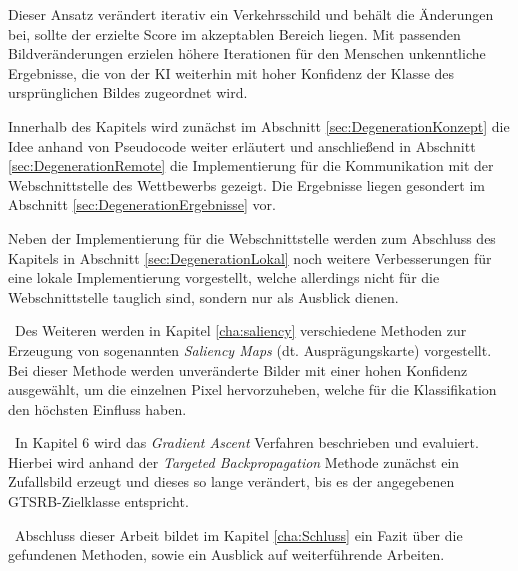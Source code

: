 Dieser Ansatz verändert iterativ ein Verkehrsschild und behält die Änderungen bei, sollte der erzielte Score im akzeptablen Bereich liegen. Mit passenden Bildveränderungen erzielen höhere Iterationen für den Menschen unkenntliche Ergebnisse, die von der \ac{KI} weiterhin mit hoher Konfidenz der Klasse des ursprünglichen Bildes zugeordnet wird. 

Innerhalb des Kapitels wird zunächst im Abschnitt \ref{sec:DegenerationKonzept} die Idee anhand von Pseudocode weiter erläutert und anschließend in Abschnitt \ref{sec:DegenerationRemote} die Implementierung für die Kommunikation mit der Webschnittstelle des Wettbewerbs gezeigt. Die Ergebnisse liegen gesondert im Abschnitt \ref{sec:DegenerationErgebnisse} vor. 

Neben der Implementierung für die Webschnittstelle werden zum Abschluss des Kapitels in Abschnitt \ref{sec:DegenerationLokal} noch weitere Verbesserungen für eine lokale Implementierung vorgestellt, welche allerdings nicht für die Webschnittstelle tauglich sind, sondern nur als Ausblick dienen.


~\newline Des Weiteren werden in Kapitel \ref{cha:saliency} verschiedene Methoden zur Erzeugung von sogenannten \textit{Saliency Maps} (dt. Ausprägungskarte) vorgestellt. Bei dieser Methode werden unveränderte Bilder mit einer hohen Konfidenz ausgewählt, um die einzelnen Pixel hervorzuheben, welche für die Klassifikation den höchsten Einfluss haben.

~\newline In Kapitel 6 wird das \textit{Gradient Ascent} Verfahren beschrieben und evaluiert. Hierbei wird anhand der \textit{Targeted Backpropagation} Methode zunächst ein Zufallsbild erzeugt und dieses so lange verändert, bis es der angegebenen \ac{GTSRB}-Zielklasse entspricht.

~\newline Abschluss dieser Arbeit bildet im Kapitel \ref{cha:Schluss} ein Fazit über die gefundenen Methoden, sowie ein Ausblick auf weiterführende Arbeiten. 
